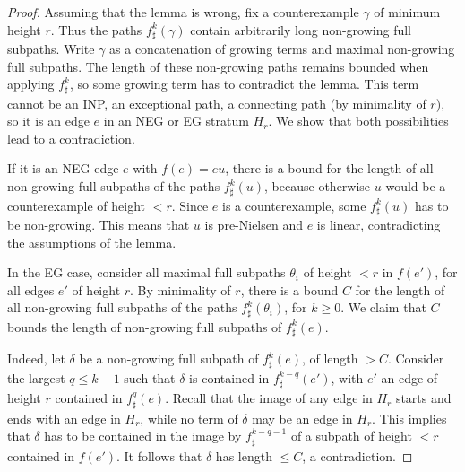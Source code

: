 \documentclass[11pt]{amsart}
\theoremstyle{remark}
\begin{document}
\begin{proof} 
   Assuming that the lemma is wrong, fix a counterexample  $\gamma$ of minimum height $r$. Thus the paths $f^k_\sharp(\gamma) $ contain arbitrarily long non-growing full subpaths. Write $\gamma$ as a concatenation of growing terms and maximal non-growing full subpaths. The length of these non-growing paths remains bounded when applying $f^k_\sharp $, so some growing term has to contradict the lemma. This term cannot be an INP, an exceptional path, a connecting path (by minimality of $r$), so it is an edge  $e$ in an NEG or EG stratum $H_r$. We show that both possibilities lead to a contradiction.


If it is an NEG edge $e$ with $f(e)=eu$, there is a bound for the length of all non-growing full subpaths of the paths $f^k_\sharp(u) $, because otherwise $u$ would be a counterexample of   height $<r$.  Since $e$ is a counterexample,   some $f^k_\sharp(u) $ has to be non-growing. This means that $u$ is pre-Nielsen and $e$ is linear,  contradicting the assumptions of the lemma.

In the EG case, consider all maximal full subpaths $\theta_i$ of   height $<r$ in $f(e')$, for all edges $e'$  of height $r$. 
 By minimality of $r$, there is a bound $C$ for the length of all non-growing full subpaths of the paths $f^k_\sharp(\theta_i)$, for $k\ge0$. We claim that $C$ bounds the length of non-growing full subpaths of $f^k_\sharp(e) $. 
 
 Indeed, let $\delta$ be a non-growing full subpath of $f^k_\sharp(e)$, of length $>C$. Consider the largest $q\le k-1$ such that $\delta$ is contained in $f^{k-q}_\sharp(e')$, with $e'$ an edge of height $r$ contained in $f^q_\sharp(e) $. Recall that the image of any edge in $H_r$ starts and ends with an edge in $H_r$, while no term of $\delta$ may be an edge in $H_r$.  This implies that 
 $\delta$ has to be contained in the image by $f^{k-q-1}_\sharp$ of a subpath of height $<r$ contained in $f(e')$.  
 It follows that $\delta$ has length $\le C$, a contradiction.
  \end{proof}
\end{document}
